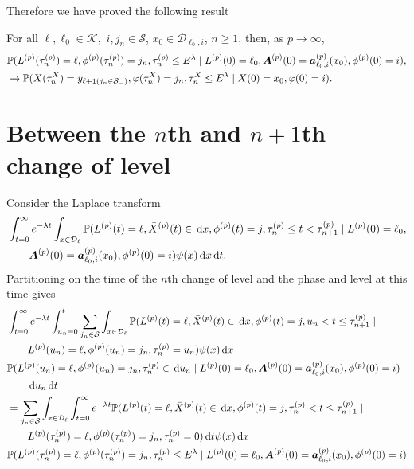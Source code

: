 Therefore we have proved the following result 
\begin{lem}\label{lem: kKKJJJF}
	For all \(\ell,\ell_0\in\mathcal K,\) \(i,j_n\in\mathcal S\), \(x_0\in\mathcal D_{\ell_0,i}\), \(n\geq 1\), then, as \(p\to\infty\),
	\begin{align}
		&\mathbb P(L^{(p)}(\tau_n^{(p)}) = \ell, \phi^{(p)}(\tau_n^{(p)}) = j_n, \tau_{n}^{(p)}\leq E^{\lambda}
		 \mid L^{(p)}(0)=\ell_0, \boldsymbol A^{(p)}(0)=\boldsymbol  a_{\ell_0,i}^{(p)}(x_0), \phi^{(p)}(0)=i),\nonumber 
		 \\&\to \mathbb P(X(\tau_n^X) = y_{\ell+1(j_{n}\in\mathcal S_-)}, 
		\varphi(\tau_n^X) = j_n, \tau_{n}^X\leq E^\lambda
		\mid X(0)=x_0, \varphi(0)=i).
	\end{align}
\end{lem} 

\section{Between the \(n\)th and \(n+1\)th change of level}\label{sec: between n and np1}
Consider the Laplace transform 
\begin{align}
		\nonumber&\int_{t=0}^\infty e^{-\lambda t}\int_{x\in\mathcal{D}_\ell}\mathbb P(L^{(p)}(t) = \ell, \bar X^{(p)}(t)\in\, \mathrm{d} x, \phi^{(p)}(t) = j, \tau_{n}^{(p)}\leq t<\tau_{n+1}^{(p)} \mid L^{(p)}(0)=\ell_0, 
		\\&\qquad \boldsymbol A^{(p)}(0)=\boldsymbol a_{\ell_0,i}^{(p)}(x_0), \phi^{(p)}(0)=i)\psi(x)\, \mathrm{d} x\, \mathrm{d} t.
\end{align}
Partitioning on the time of the \(n\)th change of level and the phase and level at this time gives
\begin{align}
	&\int_{t=0}^\infty e^{-\lambda t} \int_{u_n=0}^t\sum_{j_n\in\mathcal S}
	\int_{x\in\mathcal{D}_\ell}\mathbb P(L^{(p)}(t) = \ell, \bar X^{(p)}(t) \in \, \mathrm{d} x, \phi^{(p)}(t) = j, 
	u_n<t \leq \tau_{n+1}^{(p)} \mid\nonumber 
	 \\&\qquad{} L^{(p)}(u_n) = \ell, \phi^{(p)}(u_n) = j_n, \tau_{n}^{(p)}= u_n)\psi(x)\, \mathrm{d} x \nonumber
	 \\&\mathbb P(L^{(p)}(u_n) = \ell, \phi^{(p)}(u_n) = j_n, \tau_{n}^{(p)}\in \, \mathrm{d} u_n 
	 \mid L^{(p)}(0)=\ell_0, \boldsymbol A^{(p)}(0)=\boldsymbol  a_{\ell_0,i}^{(p)}(x_0), \phi^{(p)}(0)=i)\nonumber 
	 \\&\qquad{}\, \mathrm{d} u_n\, \mathrm{d} t \nonumber 
	 \\&= \sum_{j_n\in\mathcal S}
	\int_{x\in\mathcal{D}_\ell} \int_{t=0}^\infty e^{-\lambda t} \mathbb P(L^{(p)}(t) = \ell, \bar X^{(p)}(t) \in \, \mathrm{d} x, \phi^{(p)}(t) = j, 
	\tau_n^{(p)}<t \leq \tau_{n+1}^{(p)} \mid\nonumber 
	 \\&\qquad{} L^{(p)}(\tau_n^{(p)}) = \ell, \phi^{(p)}(\tau_n^{(p)}) = j_n, \tau_{n}^{(p)}= 0)\, \mathrm{d} t \psi(x)\, \mathrm{d} x \nonumber
	 \\&\mathbb P(L^{(p)}(\tau_n^{(p)}) = \ell, \phi^{(p)}(\tau_n^{(p)}) = j_n, \tau_{n}^{(p)}\leq E^\lambda 
	 \mid L^{(p)}(0)=\ell_0, \boldsymbol A^{(p)}(0)=\boldsymbol  a_{\ell_0,i}^{(p)}(x_0), \phi^{(p)}(0)=i) \label{eqn: l whkrqvlkjbrd}
\end{align}
